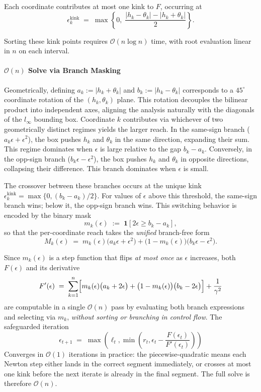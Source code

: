 \documentclass{article}
\begin{document}
Each coordinate contributes at most one kink to $F$, occurring at
\[
  \epsilon_k^{\mathrm{kink}}
    \;=\; \max\!\left\{0,\;
      \frac{|h_k-\theta_{k}|-|h_k+\theta_{k}|}{2}
    \right\}.
\]

Sorting these kink points requires $\mathcal{O}(n\log n)$ time, with root
evaluation linear in $n$ on each interval.
\paragraph{$\mathcal{O}(n)$ Solve via Branch Masking}
Geometrically, defining $a_k := |h_k+\theta_k|$ and $b_k := |h_k-\theta_k|$ corresponds to a $45^{\circ}$ coordinate rotation of the $(h_k, \theta_k)$ plane. This rotation decouples the bilinear product into independent axes, aligning the analysis naturally with the diagonals of the $l_\infty$ bounding box. Coordinate $k$ contributes via whichever of two geometrically distinct regimes yields the larger reach. In the same-sign branch ($a_k\epsilon + \epsilon^2$), the box pushes $h_k$ and $\theta_k$ in the same direction, expanding their sum. This regime dominates when $\epsilon$ is large relative to the gap $b_k - a_k$. Conversely, in the opp-sign branch ($b_k\epsilon - \epsilon^2$), the box pushes $h_k$ and $\theta_k$ in opposite directions, collapsing their difference. This branch dominates when $\epsilon$ is small.

The crossover between these branches occurs at the unique kink $\epsilon_k^{\mathrm{kink}} = \max\{0, (b_k - a_k)/2\}$. For values of $\epsilon$ above this threshold, the same-sign branch wins; below it, the opp-sign branch wins. This switching behavior is encoded by the binary mask
\[
  m_k(\epsilon) \;:=\; \mathbf{1}\!\left[2\epsilon \geq b_k - a_k\right],
\]
so that the per-coordinate reach takes the \emph{unified} branch-free form
\begin{equation}
  M_k(\epsilon)
    \;=\; m_k(\epsilon)\bigl(a_k\epsilon+\epsilon^2\bigr)
      + \bigl(1-m_k(\epsilon)\bigr)\bigl(b_k\epsilon-\epsilon^2\bigr).
\end{equation}

Since $m_k(\epsilon)$ is a step function that flips \emph{at most once} as
$\epsilon$ increases, both $F(\epsilon)$ and its derivative
\begin{equation}
  F'(\epsilon)
    \;=\; \sum_{k=1}^{n}\Bigl[
        m_k(\epsilon)\bigl(a_k + 2\epsilon\bigr)
      + \bigl(1-m_k(\epsilon)\bigr)\bigl(b_k - 2\epsilon\bigr)
    \Bigr] + \frac{1}{\gamma^2}
\end{equation}
are computable in a single $\mathcal{O}(n)$ pass by evaluating both branch
expressions and selecting via $m_k$, \emph{without sorting or branching in
control flow}. The safeguarded
iteration
\[
  \epsilon_{t+1}
    \;=\; \max\!\left(\ell_t,\min\!\left(r_t, \epsilon_t - \frac{F(\epsilon_t)}{F'(\epsilon_t)}\right)\right)
\]
Converges in $\mathcal{O}(1)$ iterations in practice: the piecewise-quadratic means each Newton step either lands in the correct segment immediately, or crosses at most one kink before the next iterate is already in the final segment. The full solve is therefore $\mathcal{O}(n)$.


\end{document}
